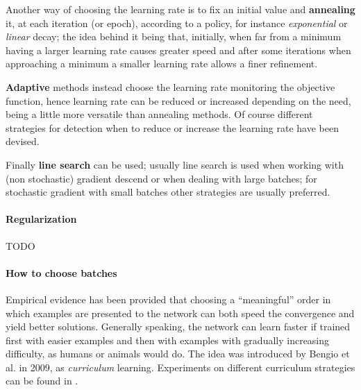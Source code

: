 Another way of choosing the learning rate is to fix an initial value and \textbf{annealing} it, at each iteration (or epoch), according to a policy, for instance \textit{exponential} or \textit{linear} decay; the idea behind it being that, initially, when far from a minimum having a larger learning rate causes greater speed and after some iterations when approaching a minimum a smaller learning rate allows a finer refinement.

\textbf{Adaptive} methods instead choose the learning rate monitoring the objective function, hence learning rate can be reduced
or increased depending on the need, being a little more versatile than annealing methods. Of course different strategies for detection when to reduce or increase the learning rate have been devised.

Finally \textbf{line search} can be used; usually line search is used when working with (non stochastic) gradient descend or when dealing with large batches; for stochastic gradient with small batches other strategies are usually preferred.

\paragraph{Regularization}
TODO

\paragraph{How to choose batches}

Empirical evidence has been provided that choosing a ``meaningful'' order in which examples are presented to the network can both speed the convergence and yield better solutions. Generally speaking, the network can learn faster if trained first with easier examples and then with examples with gradually increasing difficulty, as humans or animals would do. The idea was introduced by Bengio et al.\cite{curriculumLearning} in 2009, as \textit{curriculum} learning. Experiments on different curriculum strategies can be found in \cite{learningToExecute}.

